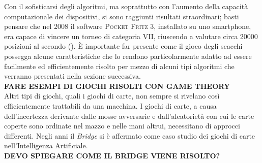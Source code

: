 Con il sofisticarsi degli algoritmi, ma soprattutto con l'aumento della capacità computazionale dei dispositivi, si sono raggiunti risultati straordinari; basti pensare che nel 2008 il software \textsc{Pocket Fritz 3}, installato su uno smartphone, era capace di vincere un torneo di categoria VII, riuscendo a valutare circa 20000 posizioni al secondo (\cite{pocketfritz}).
È importante far presente come il gioco degli scacchi possegga alcune caratteristiche che lo rendono particolarmente adatto ad essere facilmente ed efficientemente risolto per mezzo di alcuni tipi algoritmi che verranno presentati nella sezione successiva.\\




\textbf{FARE ESEMPI DI GIOCHI RISOLTI CON GAME THEORY}\\



Altri tipi di giochi, quali i giochi di carte, non sempre si rivelano così efficientemente trattabili da una macchina.
I giochi di carte, a causa dell'incertezza derivante dalle mosse avversarie e dall'aleatorietà con cui le carte coperte sono ordinate nel mazzo e nelle mani altrui, necessitano di approcci differenti.
Negli anni il \emph{Bridge} si è affermato come caso studio dei giochi di carte nell'Intelligenza Artificiale.\\




\textbf{DEVO SPIEGARE COME IL BRIDGE VIENE RISOLTO?}\\






